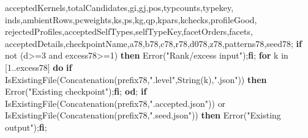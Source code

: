 \documentclass[
  10pt,
  letterpaper,
]{article}
\newenvironment{Shaded}{}{}
\newcommand{\BuiltInTok}[1]{\textcolor[rgb]{0.00,0.50,0.00}{#1}}
\newcommand{\ConstantTok}[1]{\textcolor[rgb]{0.53,0.00,0.00}{#1}}
\newcommand{\ControlFlowTok}[1]{\textcolor[rgb]{0.00,0.44,0.13}{\textbf{#1}}}
\newcommand{\ExtensionTok}[1]{#1}
\newcommand{\FloatTok}[1]{\textcolor[rgb]{0.25,0.63,0.44}{#1}}
\newcommand{\NormalTok}[1]{#1}
\newcommand{\OperatorTok}[1]{\textcolor[rgb]{0.40,0.40,0.40}{#1}}
\newcommand{\StringTok}[1]{\textcolor[rgb]{0.25,0.44,0.63}{#1}}
\newcommand{\VariableTok}[1]{\textcolor[rgb]{0.10,0.09,0.49}{#1}}
\begin{document}
\begin{Shaded}
\begin{Highlighting}[]
  \VariableTok{acceptedKernels}\OperatorTok{,}\VariableTok{totalCandidates}\OperatorTok{,}\VariableTok{gi}\OperatorTok{,}\VariableTok{gj}\OperatorTok{,}\VariableTok{pos}\OperatorTok{,}\VariableTok{typcounts}\OperatorTok{,}\VariableTok{typekey}\OperatorTok{,}
  \VariableTok{inds}\OperatorTok{,}\VariableTok{ambientRows}\OperatorTok{,}\VariableTok{pcweights}\OperatorTok{,}\VariableTok{ks}\OperatorTok{,}\VariableTok{ps}\OperatorTok{,}\VariableTok{kg}\OperatorTok{,}\VariableTok{qp}\OperatorTok{,}\VariableTok{kpars}\OperatorTok{,}\VariableTok{kchecks}\OperatorTok{,}\VariableTok{profileGood}\OperatorTok{,}
  \VariableTok{rejectedProfiles}\OperatorTok{,}\VariableTok{acceptedSelfTypes}\OperatorTok{,}\VariableTok{selfTypeKey}\OperatorTok{,}\VariableTok{facetOrders}\OperatorTok{,}\VariableTok{facets}\OperatorTok{,}
  \VariableTok{acceptedDetails}\OperatorTok{,}\VariableTok{checkpointName}\OperatorTok{,}\VariableTok{a78}\OperatorTok{,}\VariableTok{b78}\OperatorTok{,}\VariableTok{c78}\OperatorTok{,}\VariableTok{r78}\OperatorTok{,}\VariableTok{d078}\OperatorTok{,}\VariableTok{z78}\OperatorTok{,}\VariableTok{patterns78}\OperatorTok{,}\VariableTok{seed78}\OperatorTok{;}
 \ControlFlowTok{if} \ConstantTok{not}\NormalTok{ (}\VariableTok{d}\OperatorTok{\textgreater{}=}\FloatTok{3} \ConstantTok{and} \VariableTok{excess78}\OperatorTok{\textgreater{}=}\FloatTok{1}\NormalTok{) }\ControlFlowTok{then} \BuiltInTok{Error}\NormalTok{(}\StringTok{"Rank/excess input"}\NormalTok{)}\OperatorTok{;}\ControlFlowTok{fi}\OperatorTok{;}
 \ControlFlowTok{for} \VariableTok{k} \ExtensionTok{in}\NormalTok{ [}\FloatTok{1}\OperatorTok{..}\VariableTok{excess78}\NormalTok{] }\ControlFlowTok{do}
  \ControlFlowTok{if} \BuiltInTok{IsExistingFile}\NormalTok{(}\BuiltInTok{Concatenation}\NormalTok{(}\VariableTok{prefix78}\OperatorTok{,}\StringTok{".level"}\OperatorTok{,}\BuiltInTok{String}\NormalTok{(}\VariableTok{k}\NormalTok{)}\OperatorTok{,}\StringTok{".json"}\NormalTok{)) }\ControlFlowTok{then} \BuiltInTok{Error}\NormalTok{(}\StringTok{"Existing checkpoint"}\NormalTok{)}\OperatorTok{;}\ControlFlowTok{fi}\OperatorTok{;}
 \ControlFlowTok{od}\OperatorTok{;}
 \ControlFlowTok{if} \BuiltInTok{IsExistingFile}\NormalTok{(}\BuiltInTok{Concatenation}\NormalTok{(}\VariableTok{prefix78}\OperatorTok{,}\StringTok{".accepted.json"}\NormalTok{)) }\ConstantTok{or} \BuiltInTok{IsExistingFile}\NormalTok{(}\BuiltInTok{Concatenation}\NormalTok{(}\VariableTok{prefix78}\OperatorTok{,}\StringTok{".seed.json"}\NormalTok{)) }\ControlFlowTok{then} \BuiltInTok{Error}\NormalTok{(}\StringTok{"Existing output"}\NormalTok{)}\OperatorTok{;}\ControlFlowTok{fi}\OperatorTok{;}

\end{Highlighting}
\end{Shaded}
\end{document}
